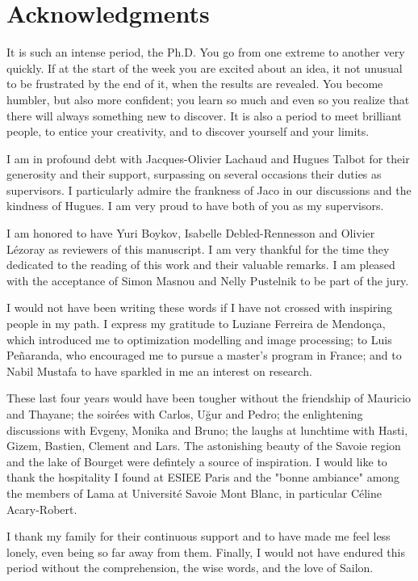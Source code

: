 \chapter*{Acknowledgments}

It is such an intense period, the Ph.D. You go from one extreme to another very quickly. If at the start of the week you are excited about an idea, it not unusual to be frustrated by the end of it, when the results are revealed. You become humbler, but also more confident; you learn so much and even so you realize that there will always something new to discover. It is also a period to meet brilliant people, to entice your creativity, and to discover yourself and your limits.

I am in profound debt with Jacques-Olivier Lachaud and Hugues Talbot for their generosity and their support, surpassing on several occasions their duties as supervisors. I particularly admire the frankness of Jaco in our discussions and the kindness of Hugues. I am very proud to have both of you as my supervisors.

I am honored to have Yuri Boykov, Isabelle Debled-Rennesson and Olivier Lézoray as reviewers of this manuscript. I am very thankful for the time they dedicated to the reading of this work and their valuable remarks. I am pleased with the acceptance of Simon Masnou and Nelly Pustelnik to be part of the jury.

I would not have been writing these words if I have not crossed with inspiring people in my path. I express my gratitude to Luziane Ferreira de Mendonça, which introduced me to optimization modelling and image processing; to Luis Peñaranda, who encouraged me to pursue a master's program in France; and to Nabil Mustafa to have sparkled in me an interest on research.

These last four years would have been tougher without the friendship of Mauricio and Thayane; the soirées with Carlos, Uğur and Pedro; the enlightening discussions with Evgeny, Monika and Bruno; the laughs at lunchtime with Hasti, Gizem, Bastien, Clement and Lars. The astonishing beauty of the Savoie region and the lake of Bourget were defintely a source of inspiration. I would like to thank the hospitality I found at ESIEE Paris and the "bonne ambiance" among the members of Lama at Université Savoie Mont Blanc, in particular Céline Acary-Robert.

I thank my family for their continuous support and to have made me feel less lonely, even being so far away from them. Finally, I would not have endured this period without the comprehension, the wise words, and the love of Sailon.
